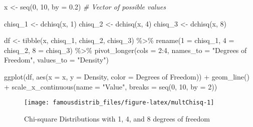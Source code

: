 \documentclass[
]{article}
\newenvironment{Shaded}{\begin{snugshade}}{\end{snugshade}}
\newcommand{\AttributeTok}[1]{\textcolor[rgb]{0.77,0.63,0.00}{#1}}
\newcommand{\CommentTok}[1]{\textcolor[rgb]{0.56,0.35,0.01}{\textit{#1}}}
\newcommand{\DecValTok}[1]{\textcolor[rgb]{0.00,0.00,0.81}{#1}}
\newcommand{\FloatTok}[1]{\textcolor[rgb]{0.00,0.00,0.81}{#1}}
\newcommand{\FunctionTok}[1]{\textcolor[rgb]{0.00,0.00,0.00}{#1}}
\newcommand{\NormalTok}[1]{#1}
\newcommand{\OtherTok}[1]{\textcolor[rgb]{0.56,0.35,0.01}{#1}}
\newcommand{\SpecialCharTok}[1]{\textcolor[rgb]{0.00,0.00,0.00}{#1}}
\newcommand{\StringTok}[1]{\textcolor[rgb]{0.31,0.60,0.02}{#1}}
\begin{document}
\begin{Shaded}
\begin{Highlighting}[]
\NormalTok{x }\OtherTok{\textless{}{-}} \FunctionTok{seq}\NormalTok{(}\DecValTok{0}\NormalTok{, }\DecValTok{10}\NormalTok{, }\AttributeTok{by =} \FloatTok{0.2}\NormalTok{) }\CommentTok{\# Vector of possible values}

\NormalTok{chisq\_1 }\OtherTok{\textless{}{-}} \FunctionTok{dchisq}\NormalTok{(x, }\DecValTok{1}\NormalTok{)}
\NormalTok{chisq\_2 }\OtherTok{\textless{}{-}} \FunctionTok{dchisq}\NormalTok{(x, }\DecValTok{4}\NormalTok{)}
\NormalTok{chisq\_3 }\OtherTok{\textless{}{-}} \FunctionTok{dchisq}\NormalTok{(x, }\DecValTok{8}\NormalTok{)}

\NormalTok{df }\OtherTok{\textless{}{-}} \FunctionTok{tibble}\NormalTok{(x, chisq\_1, chisq\_2, chisq\_3) }\SpecialCharTok{\%\textgreater{}\%}
  \FunctionTok{rename}\NormalTok{(}\StringTok{\textasciigrave{}}\AttributeTok{1}\StringTok{\textasciigrave{}} \OtherTok{=}\NormalTok{ chisq\_1, }\StringTok{\textasciigrave{}}\AttributeTok{4}\StringTok{\textasciigrave{}} \OtherTok{=}\NormalTok{ chisq\_2, }\StringTok{\textasciigrave{}}\AttributeTok{8}\StringTok{\textasciigrave{}} \OtherTok{=}\NormalTok{ chisq\_3) }\SpecialCharTok{\%\textgreater{}\%} 
  \FunctionTok{pivot\_longer}\NormalTok{(}\AttributeTok{cols =} \DecValTok{2}\SpecialCharTok{:}\DecValTok{4}\NormalTok{, }\AttributeTok{names\_to =} \StringTok{"Degrees of Freedom"}\NormalTok{, }\AttributeTok{values\_to =} \StringTok{"Density"}\NormalTok{)}

\FunctionTok{ggplot}\NormalTok{(df, }\FunctionTok{aes}\NormalTok{(}\AttributeTok{x =}\NormalTok{ x, }\AttributeTok{y =}\NormalTok{ Density, }\AttributeTok{color =} \StringTok{\textasciigrave{}}\AttributeTok{Degrees of Freedom}\StringTok{\textasciigrave{}}\NormalTok{)) }\SpecialCharTok{+}
  \FunctionTok{geom\_line}\NormalTok{() }\SpecialCharTok{+}
  \FunctionTok{scale\_x\_continuous}\NormalTok{(}\AttributeTok{name =} \StringTok{"Value"}\NormalTok{, }\AttributeTok{breaks =} \FunctionTok{seq}\NormalTok{(}\DecValTok{0}\NormalTok{, }\DecValTok{10}\NormalTok{, }\AttributeTok{by =} \DecValTok{2}\NormalTok{))}
\end{Highlighting}
\end{Shaded}

\begin{figure}

{\centering \texttt{[image: famousdistrib\_files/figure-latex/multChisq-1]} 

}

\caption{Chi-square Distributions with 1, 4, and 8 degrees of freedom}\label{fig:multChisq}
\end{figure}
\end{document}
